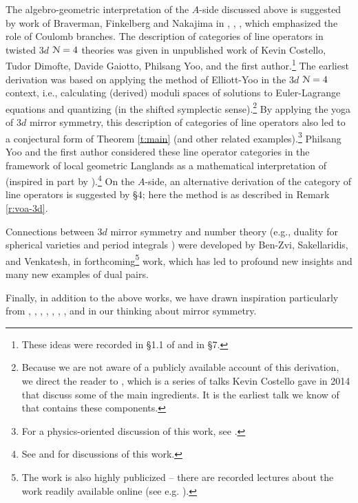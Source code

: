 \documentclass[reqno,11pt]{amsart}
\numberwithin{equation}{subsection}
\theoremstyle{remark}
\newcommand{\sN}{{\EuScript N}}
\begin{document}
The algebro-geometric interpretation of the $A$-side discussed
above is suggested by work of Braverman, Finkelberg and Nakajima
in \cite{nakajima-coulomb}, \cite{bfn}, \cite{bfn-slices}, 
which emphasized the role of Coulomb branches.
The description of categories of line operators in twisted $3d$ $\sN = 4$
theories was given in unpublished work of Kevin Costello, 
Tudor Dimofte, Davide Gaiotto, Philsang Yoo, and the first 
author.\footnote{These ideas were recorded in \S 1.1 of 
\cite{dggh} and in \cite{bf-notes} \S 7.} 
The earliest derivation
was based on applying the method of Elliott-Yoo \cite{elliott-yoo} 
in the $3d$ $\sN = 4$ context, 
i.e., calculating (derived) moduli spaces of solutions to Euler-Lagrange equations and 
quantizing (in the shifted symplectic sense).\footnote{Because 
we are not aware of a publicly available
account of this derivation, we direct the reader to \cite{costello-x-talks},
which is a series of talks Kevin Costello gave in 2014 that discuss some of 
the main ingredients. It is the earliest talk we know of that contains
these components.} 
By applying the yoga of $3d$ mirror symmetry, this description of 
categories of line operators also 
led to a conjectural form of Theorem \ref{t:main} 
(and other related examples).\footnote{For a physics-oriented discussion of this
work, see \cite{tudor-talk}.}
Philsang Yoo and the first author considered these line operator categories
in the framework of local geometric Langlands as a mathematical interpretation 
of \cite{gaiotto-witten} (inspired in part by \cite{bfn-ring}).\footnote{See
\cite{phil-talk} and \cite{jh-talk} for discussions of this work.}
On the $A$-side, an alternative derivation of the category of
line operators is suggested by 
\cite{voa-3d} \S 4; here the method is as described in Remark \ref{r:voa-3d}. 

Connections between $3d$ mirror symmetry 
and number theory (e.g., duality for spherical varieties and period
integrals \cite{sakellaridis-venkatesh}) were developed by Ben-Zvi, Sakellaridis, 
and Venkatesh, in forthcoming\footnote{The work is also highly publicized -- 
there are recorded lectures about the work readily available online 
(see e.g. \cite{bz-talk}).}
work, which has led to profound new insights and many new examples of 
dual pairs.

Finally, in addition to the above works, 
we have drawn inspiration particularly from \cite{bf-notes},
 \cite{blpw-hypertoric}, \cite{blpw}
\cite{bpw}, \cite{loop-spaces-and-connections},
\cite{char-field-thry}, 
\cite{krs}, \cite{ksv}, and \cite{teleman-icm} in our thinking about
mirror symmetry. 
\end{document}
